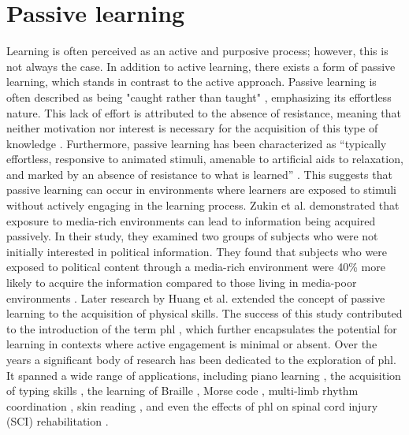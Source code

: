\section{Passive learning}
Learning is often perceived as an active and purposive process; however, this is not always the case. In addition to active learning, there exists a form of passive learning, which stands in contrast to the active approach. Passive learning is often described as being "caught rather than taught" \cite{krugman1970passive}, emphasizing its effortless nature. This lack of effort is attributed to the absence of resistance, meaning that neither motivation nor interest is necessary for the acquisition of this type of knowledge \cite{Zukin1984}.
Furthermore, passive learning has been characterized as “typically effortless, responsive to animated stimuli, amenable to artificial aids to relaxation, and marked by an absence of resistance to what is learned” \cite{Huang2008,krugman1970passive}. This suggests that passive learning can occur in environments where learners are exposed to stimuli without actively engaging in the learning process.
Zukin et al. \cite{Zukin1984} demonstrated that exposure to media-rich environments can lead to information being acquired passively. In their study, they examined two groups of subjects who were not initially interested in political information. They found that subjects who were exposed to political content through a media-rich environment were 40\% more likely to acquire the information compared to those living in media-poor environments \cite{zukin1984passive,Huang2008}.
Later research by Huang et al. \cite{Huang2008} extended the concept of passive learning to the acquisition of physical skills. The success of this study contributed to the introduction of the term \gls{phl} \cite{Pescara2019}, which further encapsulates the potential for learning in contexts where active engagement is minimal or absent.
Over the years a significant body of research has been dedicated to the exploration of \gls{phl}. It spanned a wide range of applications, including piano learning \cite{Huang2008,Kohlsdorf2010,Seim2015b,Donchev2021,Fang2023a,Fang2023}, the acquisition of typing skills \cite{Seim2014,Seim2017,Seim2014a,Learning2024}, the learning of Braille \cite{Seim2014a, Learning2024}, Morse code \cite{Seim2016a,Seim2018,Pescara2019}, multi-limb rhythm coordination \cite{Bouwer2011,Holland2010}, skin reading \cite{Luzhnica2016,Luzhnica2018}, and even the effects of \gls{phl} on spinal cord injury (SCI) rehabilitation \cite{Markow2010}.

